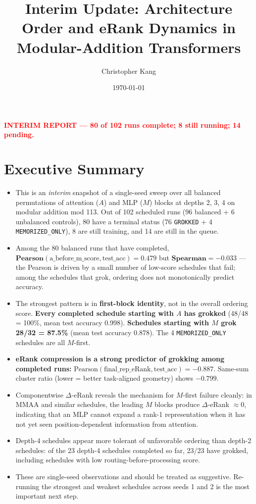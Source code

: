 \documentclass[10pt]{article}
\title{Interim Update: Architecture Order and eRank Dynamics in Modular-Addition Transformers}
\author{Christopher Kang}
\date{\today}
\begin{document}
\maketitle

\begin{center}
\textcolor{red}{\textbf{INTERIM REPORT --- 80 of 102 runs complete; 8 still running; 14 pending.}}
\end{center}

\section{Executive Summary}

\begin{itemize}
\item This is an \emph{interim} snapshot of a single-seed sweep over all balanced permutations of attention ($A$) and MLP ($M$) blocks at depths 2, 3, 4 on modular addition mod 113. Out of 102 scheduled runs (96 balanced + 6 unbalanced controls), 80 have a terminal status (76 \texttt{GROKKED} + 4 \texttt{MEMORIZED\_ONLY}), 8 are still training, and 14 are still in the queue.

\item Among the 80 balanced runs that have completed, $\mathbf{Pearson(\mathrm{a\_before\_m\_score}, \mathrm{test\_acc}) = 0.479}$ but $\mathbf{Spearman = -0.033}$ --- the Pearson is driven by a small number of low-score schedules that fail; among the schedules that grok, ordering does not monotonically predict accuracy.

\item The strongest pattern is in \textbf{first-block identity}, not in the overall ordering score. \textbf{Every completed schedule starting with $A$ has grokked} (48/48 = 100\%, mean test accuracy 0.998). \textbf{Schedules starting with $M$ grok 28/32 = 87.5\%} (mean test accuracy 0.878). The 4 \texttt{MEMORIZED\_ONLY} schedules are all $M$-first.

\item \textbf{eRank compression is a strong predictor of grokking among completed runs:} $\mathrm{Pearson}(\mathrm{final\_rep\_eRank}, \mathrm{test\_acc}) = -0.887$. Same-sum cluster ratio (lower = better task-aligned geometry) shows $-0.799$.

\item Componentwise $\Delta\!$-eRank reveals the mechanism for $M$-first failure cleanly: in MMAA and similar schedules, the leading $M$ blocks produce $\Delta\!$-eRank $\approx 0$, indicating that an MLP cannot expand a rank-1 representation when it has not yet seen position-dependent information from attention.

\item Depth-4 schedules appear more tolerant of unfavorable ordering than depth-2 schedules: of the 23 depth-4 schedules completed so far, 23/23 have grokked, including schedules with low routing-before-processing score.

\item These are single-seed observations and should be treated as suggestive. Re-running the strongest and weakest schedules across seeds 1 and 2 is the most important next step.
\end{itemize}
\end{document}
